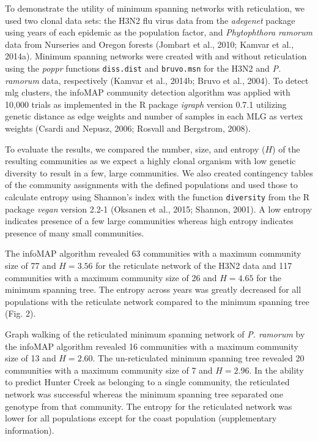 \documentclass{frontiersSCNS} %
\begin{document}
To demonstrate the utility of minimum spanning networks with
reticulation, we used two clonal data sets: the H3N2 flu virus data from
the \emph{adegenet} package using years of each epidemic as the
population factor, and \emph{Phytophthora ramorum} data from Nurseries
and Oregon forests (Jombart et al., 2010; Kamvar et al., 2014a). Minimum
spanning networks were created with and without reticulation using the
\emph{poppr} functions \texttt{diss.dist} and \texttt{bruvo.msn} for the
H3N2 and \emph{P. ramorum} data, respectively (Kamvar et al., 2014b;
Bruvo et al., 2004). To detect mlg clusters, the infoMAP community
detection algorithm was applied with 10,000 trials as implemented in the
R package \emph{igraph} version 0.7.1 utilizing genetic distance as edge
weights and number of samples in each MLG as vertex weights (Csardi and
Nepusz, 2006; Rosvall and Bergstrom, 2008).

To evaluate the results, we compared the number, size, and entropy
(\(H\)) of the resulting communities as we expect a highly clonal
organism with low genetic diversity to result in a few, large
communities. We also created contingency tables of the community
assignments with the defined populations and used those to calculate
entropy using Shannon's index with the function \texttt{diversity} from
the R package \emph{vegan} version 2.2-1 (Oksanen et al., 2015; Shannon,
2001). A low entropy indicates presence of a few large communities
whereas high entropy indicates presence of many small communities.

The infoMAP algorithm revealed 63 communities with a maximum community
size of 77 and \(H = 3.56\) for the reticulate network of the H3N2 data
and 117 communities with a maximum community size of 26 and \(H = 4.65\)
for the minimum spanning tree. The entropy across years was greatly
decreased for all populations with the reticulate network compared to
the minimum spanning tree (Fig. 2).

Graph walking of the reticulated minimum spanning network of \emph{P.
ramorum} by the infoMAP algorithm revealed 16 communities with a maximum
community size of 13 and \(H = 2.60\). The un-reticulated minimum
spanning tree revealed 20 communities with a maximum community size of 7
and \(H = 2.96\). In the ability to predict Hunter Creek as belonging to
a single community, the reticulated network was successful whereas the
minimum spanning tree separated one genotype from that community. The
entropy for the reticulated network was lower for all populations except
for the coast population (supplementary information).
\end{document}
